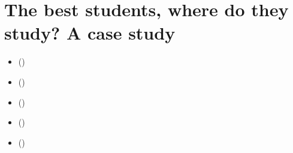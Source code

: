 \documentclass[a4paper,12pt,english]{sphinxhowto}
\begin{document}
\section{The best students, where do they study? A  case study}
\label{\detokenize{tutorial:the-best-students-where-do-they-study-a-rating-case-study}}\label{\detokenize{tutorial:ratinguniversities-tutorial-label}}
\begin{sphinxShadowBox}
\begin{itemize}
\item {} 
\label{\detokenize{tutorial:id289}}{\hyperref[\detokenize{tutorial:id87}]{}} ()

\item {} 
\label{\detokenize{tutorial:id290}}{\hyperref[\detokenize{tutorial:rating-by-ranking-with-lower-closed-quantile-limits}]{}} ()

\item {} 
\label{\detokenize{tutorial:id291}}{\hyperref[\detokenize{tutorial:inspecting-the-bipolar-valued-outranking-digraph}]{}} ()

\item {} 
\label{\detokenize{tutorial:id292}}{\hyperref[\detokenize{tutorial:rating-by-quantiles-sorting}]{}} ()

\item {} 
\label{\detokenize{tutorial:id293}}{\hyperref[\detokenize{tutorial:to-conclude}]{}} ()

\end{itemize}
\end{sphinxShadowBox}
\end{document}
